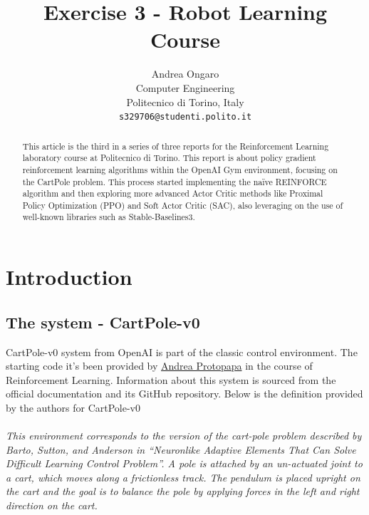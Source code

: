 \documentclass{article}
\title{Exercise 3 - Robot Learning Course}
\author{
  Andrea Ongaro\\
	Computer Engineering\\
	Politecnico di Torino, Italy\\
	\texttt{s329706@studenti.polito.it} \\
}
\begin{document}
\maketitle


\begin{abstract}
This article is the third in a series of three reports for the Reinforcement Learning laboratory course at Politecnico di Torino. This report is about policy gradient reinforcement learning algorithms within the OpenAI Gym environment, focusing on the CartPole problem. This process started implementing the naïve REINFORCE algorithm and then exploring more advanced Actor Critic methods like
Proximal Policy Optimization (PPO) and Soft Actor Critic (SAC), also leveraging on the use of well-known
libraries such as Stable-Baselines3.

\end{abstract}



\section{Introduction}
\subsection{The system - CartPole-v0}
CartPole-v0 system from OpenAI is part of the classic control environment. The starting code it's been provided by \href{https://www.polito.it/personale?p=andrea.protopapa}{Andrea Protopapa} in the course of Reinforcement Learning. Information about this system is sourced from the official documentation \cite{Cart_pole} and its GitHub repository. Below is the definition provided by the authors for CartPole-v0\\ \\
\textit{This environment corresponds to the version of the cart-pole problem described by Barto, Sutton, and Anderson in “Neuronlike Adaptive Elements That Can Solve Difficult Learning Control Problem”. A pole is attached by an un-actuated joint to a cart, which moves along a frictionless track. The pendulum is placed upright on the cart and the goal is to balance the pole by applying forces in the left and right direction on the cart.\citep{Cart_pole}}
\end{document}
